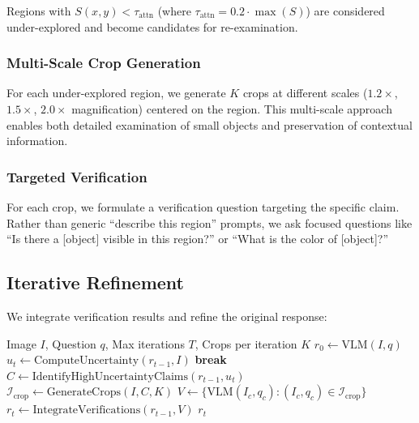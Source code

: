 \documentclass[12pt]{article}
\begin{document}
Regions with $S(x,y) < \tau_{\text{attn}}$ (where $\tau_{\text{attn}} = 0.2 \cdot \max(S)$) are considered under-explored and become candidates for re-examination.

\subsubsection{Multi-Scale Crop Generation}

For each under-explored region, we generate $K$ crops at different scales ($1.2\times$, $1.5\times$, $2.0\times$ magnification) centered on the region. This multi-scale approach enables both detailed examination of small objects and preservation of contextual information.

\subsubsection{Targeted Verification}

For each crop, we formulate a verification question targeting the specific claim. Rather than generic ``describe this region'' prompts, we ask focused questions like ``Is there a [object] visible in this region?'' or ``What is the color of [object]?''

\subsection{Iterative Refinement}

We integrate verification results and refine the original response:

\begin{algorithm}
\caption{Uncertainty-Guided Self-Correction}
\label{alg:self-correction}
\begin{algorithmic}[1]
\REQUIRE Image $I$, Question $q$, Max iterations $T$, Crops per iteration $K$
\STATE $r_0 \leftarrow \text{VLM}(I, q)$ 
    \STATE $u_t \leftarrow \text{ComputeUncertainty}(r_{t-1}, I)$
        \STATE \textbf{break} 
    \ENDIF
    \STATE $C \leftarrow \text{IdentifyHighUncertaintyClaims}(r_{t-1}, u_t)$
    \STATE $\mathcal{I}_{\text{crop}} \leftarrow \text{GenerateCrops}(I, C, K)$
    \STATE $V \leftarrow \{\text{VLM}(I_c, q_c) : (I_c, q_c) \in \mathcal{I}_{\text{crop}}\}$
    \STATE $r_t \leftarrow \text{IntegrateVerifications}(r_{t-1}, V)$
\ENDFOR
\RETURN $r_t$
\end{algorithmic}
\end{algorithm}
\end{document}
